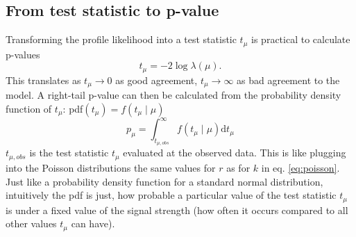 \subsection{From test statistic to p-value}   
Transforming the profile likelihood into a test statistic $t_{\mu}$ is practical to calculate p-values
\begin{equation}
    t_{\mu}=-2\log \lambda(\mu).
\end{equation}
This translates as $t_{\mu} \rightarrow 0$ as good agreement, $t_{\mu} \rightarrow \infty$ as bad agreement to the model. A right-tail p-value can then be calculated from the probability density function of $t_\mu$: pdf$(t_\mu) = f(t_\mu \mid \mu)$
\begin{equation}\label{eq:p-value}
    p_\mu = \int_{t_{\mu ,obs}}^{\infty} 
    f(t_\mu \mid \mu) \mathrm{d}t_\mu
\end{equation}
$t_{\mu ,obs}$ is the test statistic $t_\mu$ evaluated at the observed data. This is like plugging into the Poisson distributions the same values for $r$ as for $k$ in eq. \ref{eq:poisson}. Just like a probability density function for a standard normal distribution, intuitively the pdf is just, how probable a particular value of the test statistic $t_\mu$ is under a fixed value of the signal strength (how often it occurs compared to all other values $t_\mu$ can have). 

